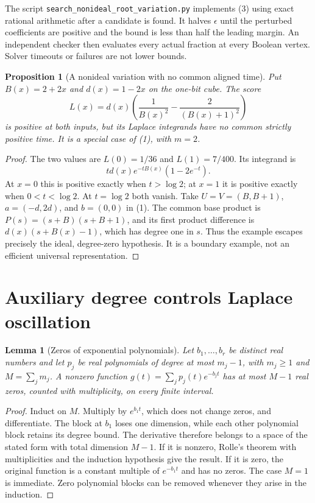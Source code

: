 \documentclass[11pt]{article}
\newtheorem{lemma}[theorem]{Lemma}
\newtheorem{proposition}[theorem]{Proposition}
\begin{document}
The script \texttt{search\_nonideal\_root\_variation.py} implements
(3) using exact rational arithmetic after a candidate is found. It
halves $\epsilon$ until the perturbed coefficients are positive and
the bound is less than half the leading margin. An independent checker
then evaluates every actual fraction at every Boolean vertex.
Solver timeouts or failures are not lower bounds.

\begin{proposition}[A nonideal variation with no common aligned time]
Put $B(x)=2+2x$ and $d(x)=1-2x$ on the one-bit cube. The score
\[
 L(x)=d(x)\left(\frac1{B(x)^2}
                          -\frac2{(B(x)+1)^2}\right)
 \tag{5}
\]
is positive at both inputs, but its Laplace integrands have no common
strictly positive time. It is a special case of (1), with $m=2$.
\end{proposition}
\begin{proof}
The two values are $L(0)=1/36$ and $L(1)=7/400$.
Its integrand is
\[
 t d(x)e^{-tB(x)}(1-2e^{-t}).
\]
At $x=0$ this is positive exactly when $t>\log 2$; at $x=1$ it is
positive exactly when $0<t<\log 2$. At $t=\log 2$ both vanish.
Take $U=V=(B,B+1)$, $a=(-d,2d)$, and $b=(0,0)$ in (1).
The common base product is $P(s)=(s+B)(s+B+1)$, and its first
product difference is $d(x)(s+B(x)-1)$, which has degree one in $s$.
Thus the example escapes precisely the ideal, degree-zero hypothesis.
It is a boundary example, not an efficient universal representation.
\end{proof}

\section{Auxiliary degree controls Laplace oscillation}

\begin{lemma}[Zeros of exponential polynomials]
Let $b_1,\ldots,b_r$ be distinct real numbers and let $p_j$ be real
polynomials of degree at most $m_j-1$, with $m_j\ge1$ and
$M=\sum_jm_j$. A nonzero function
$g(t)=\sum_jp_j(t)e^{-b_jt}$ has at most $M-1$ real zeros, counted
with multiplicity, on every finite interval.
\end{lemma}
\begin{proof}
Induct on $M$. Multiply by $e^{b_1t}$, which does not change zeros,
and differentiate. The block at $b_1$ loses one dimension, while
each other polynomial block retains its degree bound. The derivative
therefore belongs to a space of the stated form with total dimension
$M-1$. If it is nonzero, Rolle's theorem with multiplicities and the
induction hypothesis give the result. If it is zero, the original
function is a constant multiple of $e^{-b_1t}$ and has no zeros.
The case $M=1$ is immediate. Zero polynomial blocks can be removed
whenever they arise in the induction.
\end{proof}
\end{document}

